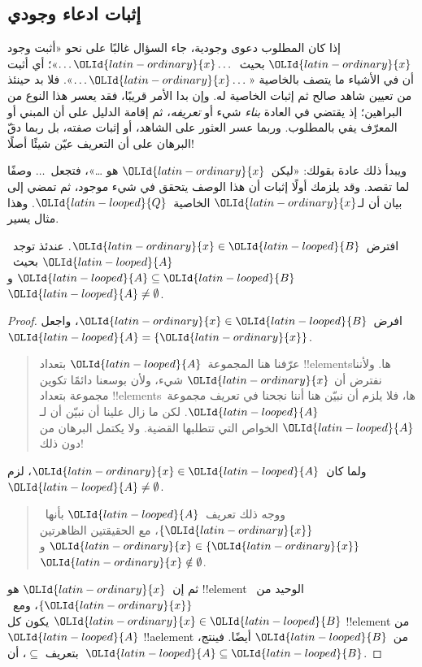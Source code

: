 \documentclass[../../../include/open-logic-section]{subfiles}
\begin{document}
\subsection{إثبات ادعاء وجودي}

إذا كان المطلوب دعوى وجودية، جاء السؤال غالبًا على نحو «أثبت وجود
$\OLId{latin-ordinary}{x}$ بحيث~$\dots \OLId{latin-ordinary}{x} \dots$»؛ أي أثبت أن في الأشياء ما يتصف بالخاصية
«$\dots \OLId{latin-ordinary}{x} \dots$». فلا بد حينئذ من تعيين شاهد صالح ثم إثبات الخاصية
له. وإن بدا الأمر قريبًا، فقد يعسر هذا النوع من البراهين؛ إذ يقتضي
في العادة \emph{بناء} شيء أو \emph{تعريفه}، ثم إقامة الدليل على أن
المبني أو المعرّف يفي بالمطلوب. وربما عسر العثور على الشاهد، أو إثبات
صفته، بل ربما دقّ البرهان على أن التعريف عيّن شيئًا أصلًا!{}

ويبدأ ذلك عادة بقولك: «ليكن~$\OLId{latin-ordinary}{x}$ هو \dots»، فتجعل~$\dots$ وصفًا لما
تقصد. وقد يلزمك أولًا إثبات أن هذا الوصف يتحقق في شيء موجود، ثم تمضي
إلى بيان أن لـ$\OLId{latin-ordinary}{x}$ الخاصية~$\OLId{latin-looped}{Q}$. وهذا مثال يسير.

\begin{prop}
  افترض~$\OLId{latin-ordinary}{x} \in \OLId{latin-looped}{B}$. عندئذ توجد~$\OLId{latin-looped}{A}$ بحيث~$\OLId{latin-looped}{A} \subseteq \OLId{latin-looped}{B}$ و
  $\OLId{latin-looped}{A} \neq \emptyset$.
\end{prop}

\begin{proof}
  افرض~$\OLId{latin-ordinary}{x} \in \OLId{latin-looped}{B}$، واجعل~$\OLId{latin-looped}{A} = \{\OLId{latin-ordinary}{x}\}$.
  \begin{quote}
    عرّفنا هنا المجموعة~$\OLId{latin-looped}{A}$ بتعداد !!{element}sها. ولأننا نفترض أن
    $\OLId{latin-ordinary}{x}$ شيء، ولأن بوسعنا دائمًا تكوين مجموعة بتعداد !!{element}sها،
    فلا يلزم أن نبيّن هنا أننا نجحنا في تعريف مجموعة~$\OLId{latin-looped}{A}$. لكن ما زال
    علينا أن نبيّن أن لـ$\OLId{latin-looped}{A}$ الخواص التي تتطلبها القضية. ولا يكتمل
    البرهان من دون ذلك!{}
  \end{quote}
  ولما كان~$\OLId{latin-ordinary}{x} \in \OLId{latin-looped}{A}$، لزم~$\OLId{latin-looped}{A} \neq \emptyset$.
  \begin{quote}
    ووجه ذلك تعريف~$\OLId{latin-looped}{A}$ بأنها~$\{\OLId{latin-ordinary}{x}\}$، مع الحقيقتين الظاهرتين
    $\OLId{latin-ordinary}{x} \in \{\OLId{latin-ordinary}{x}\}$ و$\OLId{latin-ordinary}{x} \notin \emptyset$.
  \end{quote}
  ثم إن~$\OLId{latin-ordinary}{x}$ هو !!{element} الوحيد من~$\{\OLId{latin-ordinary}{x}\}$، ومع~$\OLId{latin-ordinary}{x} \in \OLId{latin-looped}{B}$ يكون كل
  !!{element} من~$\OLId{latin-looped}{A}$ !!a{element} من~$\OLId{latin-looped}{B}$ أيضًا. فينتج، بتعريف
  $\subseteq$، أن~$\OLId{latin-looped}{A} \subseteq \OLId{latin-looped}{B}$.
\end{proof}
\end{document}
